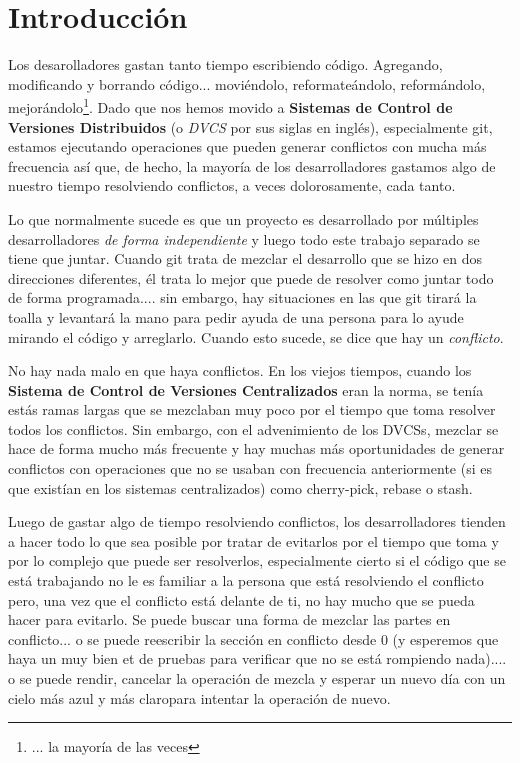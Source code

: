 
\section{Introducción}

Los desarolladores gastan tanto tiempo escribiendo código. Agregando, modificando y borrando código... moviéndolo,
reformateándolo, reformándolo, mejorándolo\footnote{... la mayoría de las veces}. Dado que nos hemos movido a
{\bf Sistemas de Control de Versiones Distribuidos} (o {\it DVCS} por sus siglas en inglés), especialmente git,
estamos ejecutando operaciones que pueden generar conflictos con mucha más frecuencia así que, de hecho, la mayoría
de los desarrolladores gastamos algo de nuestro tiempo resolviendo conflictos, a veces dolorosamente, cada tanto.

Lo que normalmente sucede es que un proyecto es desarrollado por múltiples desarrolladores {\it de forma independiente}
y luego todo este trabajo separado se tiene que juntar. Cuando git trata de mezclar el desarrollo que se hizo en dos direcciones
diferentes, él trata lo mejor que puede de resolver como juntar todo de forma programada.... sin embargo, hay situaciones en las que
git tirará la toalla y levantará la mano para pedir ayuda de una persona para lo ayude mirando el código y arreglarlo. Cuando esto
sucede, se dice que hay un {\it conflicto}.

No hay nada malo en que haya conflictos. En los viejos tiempos, cuando los {\bf Sistema de Control de Versiones Centralizados} eran la
norma, se tenía estás ramas largas que se mezclaban muy poco por el tiempo que toma resolver todos los conflictos. Sin embargo, con el
advenimiento de los DVCSs, mezclar se hace de forma mucho más frecuente y hay muchas más oportunidades de generar conflictos con
operaciones que no se usaban con frecuencia anteriormente (si es que existían en los sistemas centralizados) como cherry-pick,
rebase o stash.

Luego de gastar algo de tiempo resolviendo conflictos, los desarrolladores tienden a hacer todo lo que sea posible por tratar de
evitarlos por el tiempo que toma y por lo complejo que puede ser resolverlos, especialmente cierto si el código que se está
trabajando no le es familiar a la persona que está resolviendo el conflicto pero, una vez que el conflicto está delante de
ti, no hay mucho que se pueda hacer para evitarlo. Se puede buscar una forma de mezclar las partes en conflicto... o se puede
reescribir la sección en conflicto desde 0 (y esperemos que haya un muy bien et de pruebas para verificar que no se está rompiendo
nada).... o se puede rendir, cancelar la operación de mezcla y esperar un nuevo día con un cielo más azul y más claropara intentar
la operación de nuevo.

